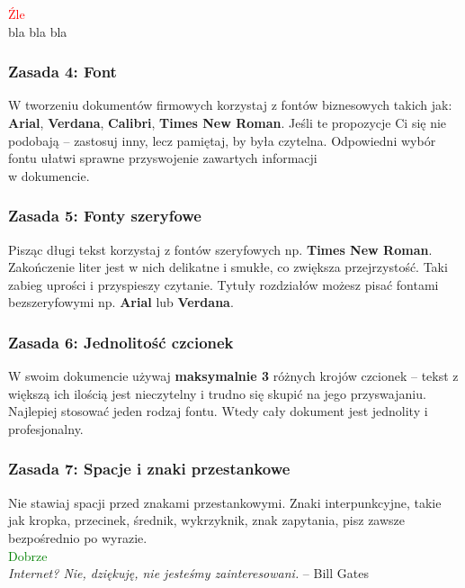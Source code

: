 \documentclass[11pt,polish]{article}
\begin{document}
  \textcolor{red}{Źle} \\
  \indent \tiny{bla bla bla}\\

\subsubsection{Zasada 4: Font}
  \normalsize W tworzeniu dokumentów firmowych korzystaj z fontów biznesowych takich jak: \textbf{Arial}, \textbf{Verdana}, \textbf{Calibri}, \textbf{Times New Roman}. Jeśli te propozycje Ci się nie podobają – zastosuj inny, lecz pamiętaj, by była czytelna. Odpowiedni wybór fontu ułatwi sprawne przyswojenie zawartych informacji \\w dokumencie. 

\subsubsection{Zasada 5: Fonty szeryfowe}
  Pisząc długi tekst korzystaj z fontów szeryfowych np. \textbf{Times New Roman}. Zakończenie liter jest w nich delikatne i smukłe, co zwiększa przejrzystość. Taki zabieg uprości i przyspieszy czytanie. Tytuły rozdziałów możesz pisać fontami bezszeryfowymi np. \textbf{Arial} lub \textbf{Verdana}.

\subsubsection{Zasada 6: Jednolitość czcionek}
  W swoim dokumencie używaj \textbf{maksymalnie 3} różnych krojów czcionek – tekst z większą ich ilością jest nieczytelny i trudno się skupić na jego przyswajaniu. Najlepiej stosować jeden rodzaj fontu. Wtedy cały dokument jest jednolity i profesjonalny.

\newpage

\subsubsection{Zasada 7: Spacje i znaki przestankowe}
  Nie stawiaj spacji przed znakami przestankowymi. Znaki interpunkcyjne, takie jak kropka, przecinek, średnik, wykrzyknik, znak zapytania, pisz zawsze bezpośrednio po wyrazie.
  \\

  \textcolor{green}{Dobrze} \\
  \indent \emph{Internet? Nie, dziękuję, nie jesteśmy zainteresowani.} – Bill Gates\\ 
\end{document}

